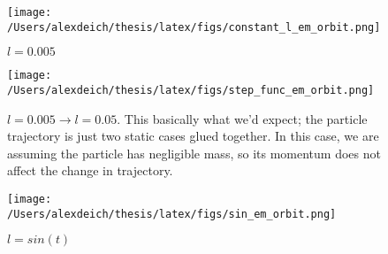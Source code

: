 \documentclass[11pt]{article}
\begin{document}
\begin{figure}[h]
  \begin{center}
    \texttt{[image: /Users/alexdeich/thesis/latex/figs/constant\_l\_em\_orbit.png]}
  \end{center}
  \caption{$l = 0.005$}
  \label{fig:constant_l_em_orbit}
\end{figure}

\begin{figure}[h]
  \begin{center}
    \texttt{[image: /Users/alexdeich/thesis/latex/figs/step\_func\_em\_orbit.png]}
  \end{center}
  \caption{$l = 0.005 \rightarrow l=0.05$.  This basically what we'd expect; the particle trajectory is just two static cases glued together.  In this case, we are assuming the particle has negligible mass, so its momentum does not affect the change in trajectory.}
  \label{fig:step_func_em_orbit}
\end{figure}

\begin{figure}[h]
  \begin{center}
    \texttt{[image: /Users/alexdeich/thesis/latex/figs/sin\_em\_orbit.png]}
  \end{center}
  \caption{$l = sin(t)$}
  \label{fig:sin_em_orbit}
\end{figure}
\end{document}
